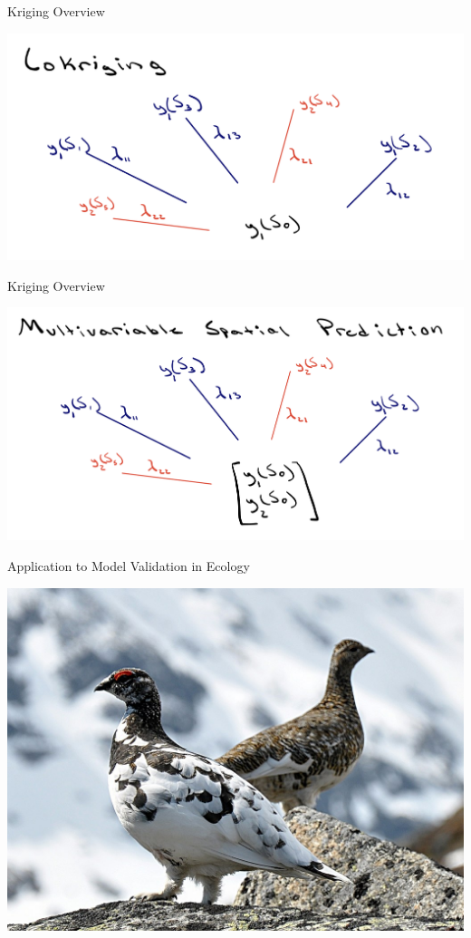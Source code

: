\documentclass[10pt]{beamer}
\begin{document}
\begin{frame}{Kriging Overview}
    \begin{center}
    \includegraphics[width = .9\textwidth]{Cokriging.png}
\end{center}
\end{frame}

\begin{frame}{Kriging Overview}
    \begin{center}
    \includegraphics[width = .9\textwidth]{MultivariableSpatialPrediction.png}
\end{center}
\end{frame}


\begin{frame}{Application to Model Validation in Ecology}
    \begin{center}
    \includegraphics[width = .9\textwidth]{RockPtarmigan.jpg}
\end{center}
\end{frame}
\end{document}
